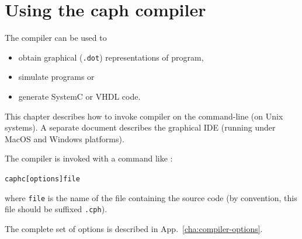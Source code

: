 
\chapter{Using the caph compiler}
\label{cha:using-caph-compiler}

The \caph compiler can be used to
\begin{itemize}
\item obtain graphical (\texttt{.dot}) representations of program,
\item simulate programs or
\item generate SystemC or VHDL code.
\end{itemize}

This chapter describes how to invoke compiler on the command-line (on Unix systems). A separate
document describes the graphical IDE (running under MacOS and Windows platforms).

The compiler is invoked with a command like :

\begin{alltt}
caphc [options] file
\end{alltt}

where \texttt{file} is the name of the file containing the source code (by convention, this file
should be suffixed \texttt{.cph}). 

The complete set of options is described in App.~\ref{cha:compiler-options}.

